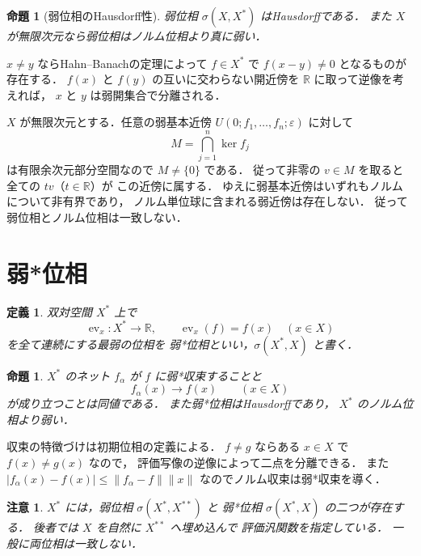 \documentclass[a5paper,10pt,onecolumn]{jsarticle}
\makeatletter
\theoremstyle{mathnotetheorem}
\newtheorem{definition}[theorem]{定義}
\newtheorem{proposition}[theorem]{命題}
\newtheorem{remark}[theorem]{注意}
\renewcommand{\proofname}{証明}
\renewenvironment{proof}[1][\proofname]{%
  \par\pushQED{\qed}\normalfont\topsep4\p@\@plus2\p@\relax
  \trivlist\item[\hskip\labelsep\bfseries #1]\ignorespaces
}{\popQED\endtrivlist\@endpefalse}
\newcommand{\norm}[1]{\lVert #1\rVert}
\makeatother
\begin{document}
\begin{proposition}[弱位相のHausdorff性]\label{prop:weak-hausdorff}
弱位相 $\sigma(X,X^*)$ はHausdorffである．
また $X$ が無限次元なら弱位相はノルム位相より真に弱い．
\end{proposition}
\begin{proof}
$x\ne y$ ならHahn--Banachの定理によって
$f\in X^*$ で $f(x-y)\ne0$ となるものが存在する．
$f(x)$ と $f(y)$ の互いに交わらない開近傍を
$\mathbb R$ に取って逆像を考えれば，
$x$ と $y$ は弱開集合で分離される．

$X$ が無限次元とする．任意の弱基本近傍
$U(0;f_1,\dots,f_n;\varepsilon)$ に対して
\[
 M=\bigcap_{j=1}^n\ker f_j
\]
は有限余次元部分空間なので $M\ne\{0\}$ である．
従って非零の $v\in M$ を取ると
全ての $tv$（$t\in\mathbb R$）が
この近傍に属する．
ゆえに弱基本近傍はいずれもノルムについて非有界であり，
ノルム単位球に含まれる弱近傍は存在しない．
従って弱位相とノルム位相は一致しない．
\end{proof}

\section{弱*位相}

\begin{definition}
双対空間 $X^*$ 上で
\[
 \operatorname{ev}_x:X^*\to\mathbb R,\qquad
 \operatorname{ev}_x(f)=f(x)
 \quad(x\in X)
\]
を全て連続にする最弱の位相を
\emph{弱*位相}といい，$\sigma(X^*,X)$ と書く．
\end{definition}

\begin{proposition}\label{prop:weak-star}
$X^*$ のネット $f_\alpha$ が $f$ に弱*収束することと
\[
 f_\alpha(x)\to f(x)\qquad(x\in X)
\]
が成り立つことは同値である．
また弱*位相はHausdorffであり，
$X^*$ のノルム位相より弱い．
\end{proposition}
\begin{proof}
収束の特徴づけは初期位相の定義による．
$f\ne g$ ならある $x\in X$ で $f(x)\ne g(x)$ なので，
評価写像の逆像によって二点を分離できる．
また
$|f_\alpha(x)-f(x)|\le\norm{f_\alpha-f}\norm x$
なのでノルム収束は弱*収束を導く．
\end{proof}

\begin{remark}
$X^*$ には，弱位相 $\sigma(X^*,X^{**})$ と
弱*位相 $\sigma(X^*,X)$ の二つが存在する．
後者では $X$ を自然に $X^{**}$ へ埋め込んで
評価汎関数を指定している．
一般に両位相は一致しない．
\end{remark}
\end{document}
